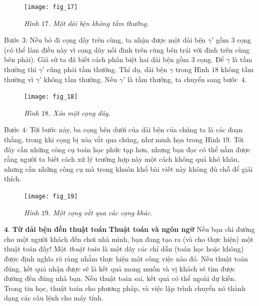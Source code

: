 \begin{multicols}{2}
\begin{figure}[H]
		\vspace*{-5pt}
		\centering
		\captionsetup{labelformat= empty, justification=centering}
		\texttt{[image: fig\_17]}
		\caption{\small\textit{\color{duongvaotoanhoc}Hình $17$. Một dải bện không tầm thường.}}
		\vspace*{-10pt}
	\end{figure}
	Bước $3$: Nếu bỏ đi cọng dây trên cùng, ta nhận được một dải bện $\gamma'$ gồm $3$ cọng (có thể làm điều này vì cọng dây nối đinh trên cùng bên trái với đinh trên cùng bên phải). Giả sử ta đã biết cách phân biệt hai dải bện gồm $3$ cọng. Để $\gamma$ là tầm thường thì $\gamma'$ cũng phải tầm thường. Thí dụ, dải bện $\gamma$ trong Hình $18$ không tầm thường vì $\gamma'$ không tầm thường. Nếu $\gamma'$ là tầm thường, ta chuyển sang bước~$4$.
	\begin{figure}[H]
		\vspace*{-5pt}
		\centering
		\captionsetup{labelformat= empty, justification=centering}
		\texttt{[image: fig\_18]}
		\caption{\small\textit{\color{duongvaotoanhoc}Hình $18$. Xóa một cọng dây.}}
		\vspace*{-10pt}
	\end{figure}
	Bước $4$: Tới bước này, ba cọng bên dưới của dải bện của chúng ta là các đoạn thẳng, trong khi cọng bị xóa vắt qua chúng, như minh họa trong Hình $19$. Tới đây cần những công cụ toán học phức tạp hơn, nhưng bạn đọc có thể nắm được rằng người ta biết cách xử lý trường hợp này một cách không quá khó khăn, nhưng cần những công cụ mà trong khuôn khổ bài viết này không đủ chỗ để giải thích.
	\begin{figure}[H]
		\vspace*{-5pt}
		\centering
		\captionsetup{labelformat= empty, justification=centering}
		\texttt{[image: fig\_19]}
		\caption{\small\textit{\color{duongvaotoanhoc}Hình $19$. Một cọng vắt qua các cọng khác.}}
		\vspace*{-10pt}
	\end{figure}
	$\pmb{4.}$ \textbf{\color{duongvaotoanhoc}Từ dải bện đến thuật toán}
	\vskip 0.1cm
	\textbf{\color{duongvaotoanhoc}Thuật toán và ngôn ngữ}
	\vskip 0.1cm
	Nếu bạn chỉ đường cho một người khách đến chơi nhà mình, bạn đang tạo ra (và cho thực hiện) một thuật toán đấy! Một \textit{thuật toán} là một dãy các chỉ dẫn (toán học hoặc không) được định nghĩa rõ ràng nhằm thực hiện một công việc nào đó. Nếu thuật toán đúng, kết quả nhận được sẽ là kết quả mong muốn và vị khách sẽ tìm được đường đến đúng nhà bạn. Nếu thuật toán sai, kết quả có thể ngoài dự kiến. Trong tin học, thuật toán cho phương pháp, và việc lập trình chuyển nó thành dạng các câu lệnh cho máy tính.

\end{multicols}
